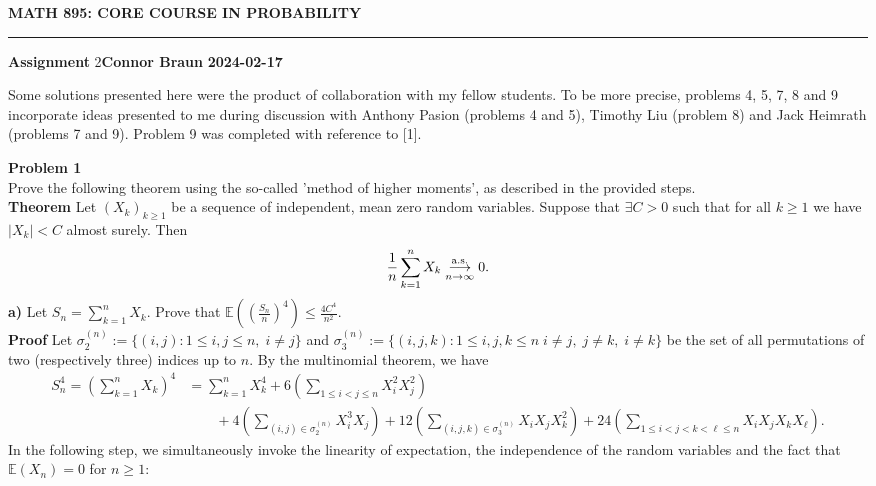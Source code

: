 \documentclass[10pt]{article}
\newcommand{\E}{\mathbb{E}}
\newcommand{\bp}[1]{\left({#1}\right)}
\newcommand{\1}[1]{\mathbbm{1}_{#1}}
\DeclareMathOperator{\as}{a.s.}
\begin{document}
    \begin{center}
        {\bf\large{MATH 895: CORE COURSE IN PROBABILITY}}
        \smallskip
        \hrule
        \smallskip
        {\bf Assignment} 2\hfill {\bf Connor Braun} \hfill {\bf 2024-02-17}
    \end{center}
    \begin{center}
        \begin{minipage}{\dimexpr\paperwidth-10cm}
            Some solutions presented here were the product of collaboration with my fellow students. To be more precise, problems 4, 5, 7, 8 and 9 incorporate ideas presented to me during discussion with Anthony Pasion (problems 4 and 5),
            Timothy Liu (problem 8) and Jack Heimrath (problems 7 and 9).
            Problem 9 was completed with reference to [1]. 
        \end{minipage}
    \end{center}
    \vspace{5pt}
    {\bf Problem 1}\\[5pt]
    Prove the following theorem using the so-called 'method of higher moments', as described in the provided steps.\\[5pt]
    {\bf Theorem}\hspace{5pt} Let $(X_k)_{k\geq 1}$ be a sequence of independent, mean zero random variables. Suppose that $\exists C>0$ such that
    for all $k\geq 1$ we have $|X_k|<C$ almost surely. Then
    \[\frac{1}{n}\sum_{k=1}^nX_k\overunderset{\as}{n\rightarrow\infty}{\longrightarrow}0.\] 
    {\bf a)}\hspace{5pt} Let $S_n=\sum_{k=1}^nX_k$. Prove that $\E\bp{\bp{\frac{S_n}{n}}^4}\leq \frac{4C^4}{n^2}$.\\[5pt]
    {\bf Proof}\hspace{5pt} Let $\sigma^{(n)}_2:=\{(i,j):1\leq i,j\leq n,\;i\neq j\}$ and $\sigma_3^{(n)}:=\{(i,j,k):1\leq i,j,k\leq n\;i\neq j,\;j\neq k,\;i\neq k\}$ be the set of all permutations of two (respectively three) indices up to $n$.
    By the multinomial theorem, we have
    \begin{align*}
        S_n^4=\bp{\sum_{k=1}^nX_k}^4&=\sum_{k=1}^nX_k^4+6\bp{\sum_{1\leq i<j\leq n}X_i^2X_j^2}\\
        &\qquad+4\bp{\sum_{(i,j)\in\sigma_2^{(n)}}X_i^3X_j}+12\bp{\sum_{(i,j,k)\in\sigma_3^{(n)}}X_iX_jX_k^2}+24\bp{\sum_{1\leq i<j<k<\ell\leq n}X_iX_jX_kX_{\ell}}.
    \end{align*}
    In the following step, we simultaneously invoke the linearity of expectation, the independence of the random variables and the fact that $\E(X_n)=0$ for $n\geq 1$:
\end{document}
